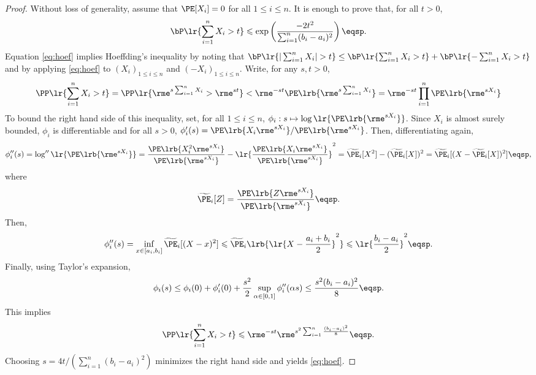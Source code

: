 \begin{proof}
Without loss of generality, assume that $\PE[X_i]=0$ for all $1\leqslant i\leqslant n$. It is enough to prove that, for all $t>0$,
\begin{equation}
\label{eq:hoef}
\bP\lr{\sum_{i=1}^n X_i>t}\leqslant \mathrm{exp}\left(\frac{-2t^2}{\sum_{i=1}^n(b_i-a_i)^2}\right)\eqsp.
\end{equation}
Equation \eqref{eq:hoef} implies Hoeffding's inequality by noting that $\bP\lr{|\sum_{i=1}^n X_i|>t}\leq \bP\lr{\sum_{i=1}^n X_i>t}+\bP\lr{-\sum_{i=1}^n X_i>t}$ and by applying \eqref{eq:hoef} to $(X_i)_{1\leqslant i\leqslant n}$ and $(-X_i)_{1\leqslant i\leqslant n}$.
 Write, for any $s,t>0$,
\begin{align*}
\PP\lr{\sum_{i=1}^n X_i>t}=\PP\lr{\rme^{s \sum_{i=1}^n X_i}>\rme^{st}} < \rme^{-st}\PE\lrb{\rme^{s \sum_{i=1}^n X_i}}=\rme^{-st}\prod_{i=1}^{n}\PE\lrb{\rme^{s X_i}}
\end{align*}
To bound the right hand side of this inequality, set, for all $1\leqslant i\leqslant n$, $\phi_i: s\mapsto \log\lr{\PE\lrb{\rme^{s X_i}}}$. Since $X_i$ is almost surely bounded,  $\phi_i$ is differentiable  and for all $s>0$, $\phi_i'(s)=\PE\lrb{X_i \rme^{s X_i}}/\PE\lrb{\rme^{s X_i}}$. Then, differentiating again,
\begin{align*}
\phi_i''(s)=\log''\lr{\PE\lrb{\rme^{s X_i}}}=\frac{\PE\lrb{X_i^2 \rme^{s X_i}}}{\PE\lrb{\rme^{s X_i}}} - \lr{\frac{\PE\lrb{X_i \rme^{s X_i}}}{\PE\lrb{\rme^{s X_i}}}}^2=\widetilde \PE_i[X^2]-(\widetilde \PE_i[X])^2 =\widetilde \PE_i[(X-\widetilde \PE_i[X])^2]\eqsp,
\end{align*}
where
\[
\widetilde \PE_i[Z]=\frac{\PE\lrb{Z \rme^{s X_i}}}{\PE\lrb{\rme^{s X_i}}}\eqsp.
\]
Then,
\[
\phi_i''(s) = \inf_{x \in [a_i,b_i]}\widetilde \PE_i[(X-x)^2] \leqslant \widetilde \PE_i\lrb{\lr{X-\frac{a_i+b_i}{2}}^2} \leqslant \lr{\frac{b_i-a_i}{2}}^2\eqsp.
\]
Finally, using Taylor's expansion,
\begin{equation}
\label{eq:hoeffding:loglaplace}
\phi_i(s)\leq \phi_i(0)+\phi_i'(0)+\frac{s^2}{2} \sup_{\alpha \in [0,1]} \phi_i''(\alpha s) \leq \frac{s^2(b_i-a_i)^2}{8}\eqsp.
\end{equation}
This implies
$$
\PP\lr{\sum_{i=1}^n X_i>t} \leqslant \rme^{-st} \rme^{s^2 \sum_{i=1}^n  \frac{(b_i-a_i)^2}{8}} \eqsp.
$$
Choosing $s=4t/(\sum_{i=1}^n (b_i-a_i)^2)$ minimizes the right hand side and yields \eqref{eq:hoef}.


\end{proof}

